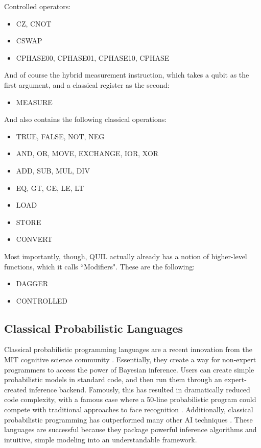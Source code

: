 \documentclass[a4paper,twocolumn,11pt,accepted=2017-05-09]{quantumarticle}
\begin{document}
Controlled operators:

\begin{itemize}
    \item CZ, CNOT 
    \item CSWAP 
    \item CPHASE00, CPHASE01, CPHASE10, CPHASE 
\end{itemize}

And of course the hybrid measurement instruction, which takes a qubit as the first argument, and a classical register as the second:

\begin{itemize}
    \item MEASURE
\end{itemize}

And also contains the following classical operations:

\begin{itemize}
    \item TRUE, FALSE, NOT, NEG 
    \item AND, OR, MOVE, EXCHANGE, IOR, XOR 
    \item ADD, SUB, MUL, DIV 
    \item EQ, GT, GE, LE, LT 
    \item LOAD 
    \item STORE 
    \item CONVERT 
\end{itemize}

Most importantly, though, QUIL actually already has a notion of higher-level functions, which it calls ``Modifiers".
These are the following:
\begin{itemize}
    \item DAGGER
    \item CONTROLLED
\end{itemize}

\subsection{Classical Probabilistic Languages}


Classical probabilistic programming languages are a recent innovation from the MIT cognitive science community \cite{goodman2012church, carpenter2017stan}.
 Essentially, they create a way for non-expert programmers to access the power of Bayesian inference. 
 Users can create simple probabilistic models in standard code, and then run them through an expert-created inference backend.
 Famously, this has resulted in dramatically reduced code complexity, with a famous case where a 50-line probabilistic program could compete with traditional approaches to face recognition \cite{50-lines}.
 Additionally, classical probabilistic programming has outperformed many other AI techniques \cite{lake2015human}.
 These languages are successful because they package powerful inference algorithms and intuitive, simple modeling into an understandable framework.
\end{document}
